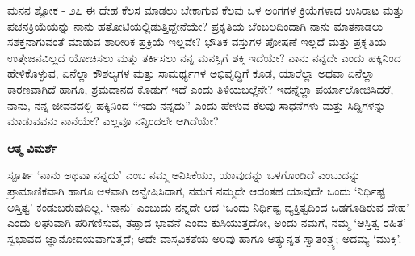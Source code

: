\begin{mananam}{\mananamfont ಮನನ ಶ್ಲೋಕ - ೨೭}
\mananamtext ಈ ದೇಹ ಕೆಲಸ ಮಾಡಲು ಬೇಕಾಗುವ ಕೆಲವು ಒಳ ಅಂಗಗಳ ಕ್ರಿಯೆಗಳಾದ ಉಸಿರಾಟ ಮತ್ತು ಪಚನಕ್ರಿಯೆಯನ್ನು ನಾನು ಹತೋಟಿಯಲ್ಲಿಡುತ್ತಿದ್ದೇನೆಯೇ? ಪ್ರಕೃತಿಯ ಬೆಂಬಲದಿಂದಾಗಿ ನಾನು ಮಾತನಾಡಲು ಸಶಕ್ತನಾಗುವಂತೆ ಮಾಡುವ ಶಾರೀರಿಕ ಪ್ರಕ್ರಿಯೆ ಇಲ್ಲವೇ? ಭೌತಿಕ ವಸ್ತುಗಳ ಪೋಷಣೆ ಇಲ್ಲದೆ ಮತ್ತು ಪ್ರಕೃತಿಯ ಉತ್ತೇಜನವಿಲ್ಲದೆ ಯೋಚಿಸಲು ಮತ್ತು ತರ್ಕಿಸಲು ನನ್ನ ಮನಸ್ಸಿಗೆ ಶಕ್ತಿ ಇದೆಯೇ? ನಾನು ನನ್ನದೇ ಎಂದು  ಹಕ್ಕಿನಿಂದ ಹೇಳಿಕೊಳ್ಳುವ, ಏನೆಲ್ಲಾ ಕೌಶಲ್ಯಗಳ ಮತ್ತು ಸಾಮರ್ಥ್ಯಗಳ ಅಭಿವೃದ್ಧಿಗೆ ಕೂಡ, ಯಾರೆಲ್ಲಾ ಅಥವಾ ಏನೆಲ್ಲಾ ಕಾರಣವಾಗಿದೆ ಹಾಗೂ, ಶ್ರಮದಾನದ ಕೊಡುಗೆ ಇದೆ ಎಂದು ತಿಳಿಯಬಲ್ಲೆನೇ? ಇದನ್ನೆಲ್ಲಾ ಪರ್ಯಾಲೋಚಿಸಿದರೆ, ನಾನು, ನನ್ನ ಜೀವನದಲ್ಲಿ ಹಕ್ಕಿನಿಂದ “ಇದು ನನ್ನದು” ಎಂದು ಹೇಳುವ ಕೆಲವು ಸಾಧನೆಗಳು ಮತ್ತು ಸಿದ್ದಿಗಳನ್ನು ಮಾಡುವವನು ನಾನೆಯೇ? ಎಲ್ಲವೂ ನನ್ನಿಂದಲೇ ಆಗಿದೆಯೇ?
\end{mananam}
\WritingHand\enspace\textbf{ಆತ್ಮ ವಿಮರ್ಶೆ}\\
\begin{inspiration}{\mananamfont ಸ್ಪೂರ್ತಿ}
\mananamtext ‘ನಾನು ಅಥವಾ ನನ್ನದು’ ಎಂಬ ನಮ್ಮ ಅನಿಸಿಕೆಯು, ಯಾವುದನ್ನು ಒಳಗೊಂಡಿದೆ ಎಂಬುದನ್ನು ಪ್ರಾಮಾಣಿಕವಾಗಿ ಹಾಗೂ ಆಳವಾಗಿ ಅನ್ವೇಷಿಸಿದಾಗ, ನಮಗೆ ನಮ್ಮದೇ ಆದಂತಹ ಯಾವುದೇ ಒಂದು ‘ನಿರ್ಧಿಷ್ಟ  ಅಸ್ತಿತ್ವ’ ಕಂಡುಬರುವುದಿಲ್ಲ. ‘ನಾನು’ ಎಂಬುದು ನನ್ನದೇ ಆದ ‘ಒಂದು ನಿರ್ಧಿಷ್ಟ ವ್ಯಕ್ತಿತ್ವದಿಂದ ಒಡಗೂಡಿರುವ  ದೇಹ’ ಎಂದು ಲಘುವಾಗಿ ಪರಿಗಣಿಸುವ, ತಪ್ಪಾದ ಭಾವನೆ ಎಂದು ಕುಸಿಯುತ್ತದೋ, ಅಂದು ನಮಗೆ, ನಮ್ಮ ‘ಅಸ್ತಿತ್ವ ರಹಿತ’ ಸ್ವಭಾವದ ಜ್ಞಾನೋದಯವಾಗುತ್ತದೆ; ಅದೇ ವಾಸ್ತವಿಕತೆಯ ಅರಿವು ಹಾಗೂ ಅತ್ಯುನ್ನತ ಸ್ವಾತಂತ್ರ್ಯ; ಅದಮ್ಯ ‘ಮುಕ್ತಿ’.
\end{inspiration}
\newpage


